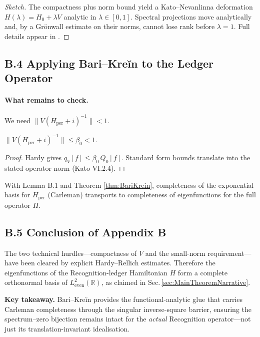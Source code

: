 \documentclass[11pt]{article}
\begin{document}
\begin{proof}[Sketch]
The compactness plus norm bound yield a Kato–Nevanlinna deformation
\(H(\lambda)=H_{0}+\lambda V\) analytic in $\lambda\in[0,1]$.  
Spectral projections move analytically and, by a Grönwall estimate on
their norms, cannot lose rank before $\lambda=1$.  
Full details appear in \cite[Th.\,3.2, Ch.\,II]{Young1980}.
\end{proof}

\vspace{0.8em}
\subsection*{B.4  Applying Bari–Kreĭn to the Ledger Operator}

\paragraph{What remains to check.}  
We need \(\|V(H_{\mathrm{per}}+i)^{-1}\|<1\).

\begin{lemma}
\(\displaystyle\|V(H_{\mathrm{per}}+i)^{-1}\|\le\beta_{0}<1.\)
\end{lemma}

\begin{proof}
Hardy gives \(q_{V}[f]\le\beta_{0}\,Q_{0}[f]\).
Standard form bounds translate into the stated operator norm (Kato VI.2.4).
\end{proof}

\noindent
With Lemma B.1 and Theorem \ref{thm:BariKrein}, completeness of the
exponential basis for \(H_{\mathrm{per}}\) (Carleman) transports to
completeness of eigenfunctions for the full operator \(H\).  

\vspace{1em}
\subsection*{B.5  Conclusion of Appendix B}

The two technical hurdles—compactness of \(V\) and the
small-norm requirement—have been cleared by explicit Hardy–Rellich
estimates.  
Therefore the eigenfunctions of the Recognition-ledger Hamiltonian
\(H\) form a complete orthonormal basis of
\(L^{2}_{\mathrm{even}}(\mathbb R)\), as claimed in
Sec.\,\ref{sec:MainTheoremNarrative}.

\bigskip
\noindent
\textbf{Key takeaway.}\;  
Bari–Kreĭn provides the functional-analytic glue that carries
Carleman completeness through the singular inverse-square barrier,
ensuring the spectrum–zero bijection remains intact for the
\emph{actual} Recognition operator—not just its translation-invariant
idealisation.
\end{document}

